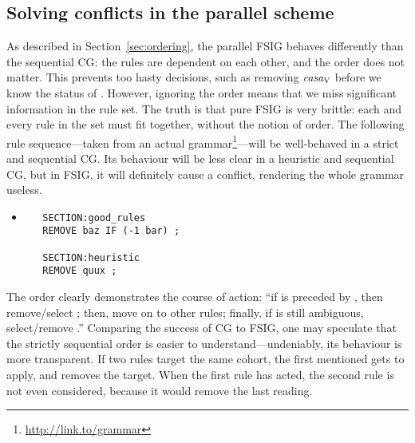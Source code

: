 

\subsection{Solving conflicts in the parallel scheme}

As described in Section~\ref{sec:ordering}, the parallel FSIG behaves differently than the 
sequential CG: the rules are dependent on each other, and the order does not matter.
This prevents too hasty decisions, such as removing $\text{\em casa}_{\text{\sc V}}$ before we know the status of \la{}. 
However, ignoring the order means that we miss significant information in the rule set. 
The truth is that pure FSIG is very brittle: each and every rule in the set must fit together, without the notion of order. The following rule sequence---taken from an actual grammar\footnote{\url{http://link.to/grammar}}---will be well-behaved in a strict and sequential CG. Its behaviour will be less clear in a heuristic and sequential CG, but in FSIG, it will definitely cause a conflict, rendering the whole grammar useless.

\begin{itemize}
\item[]
   \begin{verbatim}
   SECTION:good_rules
   REMOVE baz IF (-1 bar) ;

   SECTION:heuristic   
   REMOVE quux ;
   \end{verbatim}
\end{itemize}

The order clearly demonstrates the course of action: ``if  is preceded by , then remove/select ; then, move on to other rules; finally, if  is still ambiguous, select/remove .'' 
Comparing the success of CG to FSIG, one may speculate that the strictly sequential order is easier to understand---undeniably, its behaviour is more transparent. %
If two rules target the same cohort, the first mentioned gets to apply, and removes the target. When the first rule has acted, the second rule is not even considered, because it would remove the last reading.

